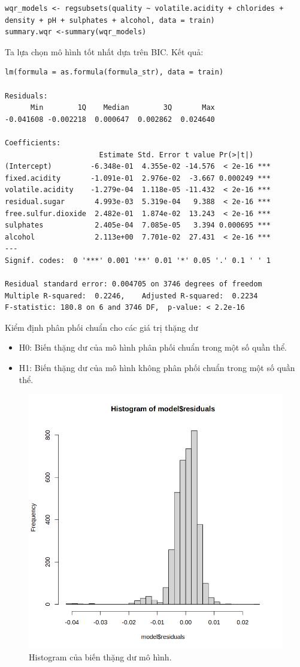 \begin{lstlisting}
wqr_models <- regsubsets(quality ~ volatile.acidity + chlorides + density + pH + sulphates + alcohol, data = train)
summary.wqr <-summary(wqr_models)
\end{lstlisting}
Ta lựa chọn mô hình tốt nhất dựa trên BIC. Kết quả:
\begin{lstlisting}
lm(formula = as.formula(formula_str), data = train)

Residuals:
      Min        1Q    Median        3Q       Max 
-0.041608 -0.002218  0.000647  0.002862  0.024640 

Coefficients:
                      Estimate Std. Error t value Pr(>|t|)    
(Intercept)         -6.348e-01  4.355e-02 -14.576  < 2e-16 ***
fixed.acidity       -1.091e-01  2.976e-02  -3.667 0.000249 ***
volatile.acidity    -1.279e-04  1.118e-05 -11.432  < 2e-16 ***
residual.sugar       4.993e-03  5.319e-04   9.388  < 2e-16 ***
free.sulfur.dioxide  2.482e-01  1.874e-02  13.243  < 2e-16 ***
sulphates            2.405e-04  7.085e-05   3.394 0.000695 ***
alcohol              2.113e+00  7.701e-02  27.431  < 2e-16 ***
---
Signif. codes:  0 '***' 0.001 '**' 0.01 '*' 0.05 '.' 0.1 ' ' 1

Residual standard error: 0.004705 on 3746 degrees of freedom
Multiple R-squared:  0.2246,	Adjusted R-squared:  0.2234 
F-statistic: 180.8 on 6 and 3746 DF,  p-value: < 2.2e-16
\end{lstlisting}
Kiểm định phân phối chuẩn cho các giá trị thặng dư
\begin{itemize}
    \item H0: Biến thặng dư của mô hình phân phối chuẩn trong một số quần thể.
    \item H1: Biến thặng dư của mô hình không phân phối chuẩn trong một số quần thể.
\end{itemize}
\begin{figure}[H]
    \centering
    \includegraphics[width=0.75\columnwidth]{wine_figures/white_residual_test.png}
    \caption{Histogram của biến thặng dư mô hình.}
    \label{fig:white_residual_test}
\end{figure}
